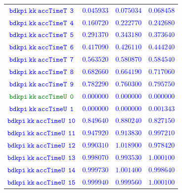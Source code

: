 \documentclass[10pt,a4paper]{article}
\begin{document}
\begin{table}[h!]
{\begin{tabular}{cccc}
\textcolor{blue}{$\mathtt{bdkpi~kk~accTimeT~~3}$} & \textcolor{blue}{$0.045933$}& \textcolor{blue}{$0.075034$}& \textcolor{blue}{$0.068458$}\\
\textcolor{blue}{$\mathtt{bdkpi~kk~accTimeT~~4}$} & \textcolor{blue}{$0.160720$}& \textcolor{blue}{$0.222770$}& \textcolor{blue}{$0.242680$}\\
\textcolor{blue}{$\mathtt{bdkpi~kk~accTimeT~~5}$} & \textcolor{blue}{$0.291370$}& \textcolor{blue}{$0.343180$}& \textcolor{blue}{$0.373640$}\\
\textcolor{blue}{$\mathtt{bdkpi~kk~accTimeT~~6}$} & \textcolor{blue}{$0.417090$}& \textcolor{blue}{$0.426110$}& \textcolor{blue}{$0.444240$}\\
\textcolor{blue}{$\mathtt{bdkpi~kk~accTimeT~~7}$} & \textcolor{blue}{$0.563520$}& \textcolor{blue}{$0.580870$}& \textcolor{blue}{$0.584540$}\\
\textcolor{blue}{$\mathtt{bdkpi~kk~accTimeT~~8}$} & \textcolor{blue}{$0.682660$}& \textcolor{blue}{$0.664190$}& \textcolor{blue}{$0.717060$}\\
\textcolor{blue}{$\mathtt{bdkpi~kk~accTimeT~~9}$} & \textcolor{blue}{$0.782290$}& \textcolor{blue}{$0.760300$}& \textcolor{blue}{$0.795750$}\\
\textcolor{Green}{$\mathtt{bdkpi~kk~accTimeU~~0}$} & \textcolor{blue}{$0.000000$}& \textcolor{blue}{$0.000000$}& \textcolor{blue}{$0.000000$}\\
\textcolor{blue}{$\mathtt{bdkpi~kk~accTimeU~~1}$} & \textcolor{blue}{$0.000000$}& \textcolor{blue}{$0.000000$}& \textcolor{blue}{$0.001343$}\\
\textcolor{blue}{$\mathtt{bdkpi~kk~accTimeU~~10}$} & \textcolor{blue}{$0.849640$}& \textcolor{blue}{$0.880240$}& \textcolor{blue}{$0.827150$}\\
\textcolor{blue}{$\mathtt{bdkpi~kk~accTimeU~~11}$} & \textcolor{blue}{$0.947920$}& \textcolor{blue}{$0.913830$}& \textcolor{blue}{$0.997210$}\\
\textcolor{blue}{$\mathtt{bdkpi~kk~accTimeU~~12}$} & \textcolor{blue}{$0.990310$}& \textcolor{blue}{$1.018900$}& \textcolor{blue}{$0.978420$}\\
\textcolor{blue}{$\mathtt{bdkpi~kk~accTimeU~~13}$} & \textcolor{blue}{$0.998070$}& \textcolor{blue}{$0.993530$}& \textcolor{blue}{$1.000100$}\\
\textcolor{blue}{$\mathtt{bdkpi~kk~accTimeU~~14}$} & \textcolor{blue}{$0.999730$}& \textcolor{blue}{$1.001400$}& \textcolor{blue}{$0.998640$}\\
\textcolor{blue}{$\mathtt{bdkpi~kk~accTimeU~~15}$} & \textcolor{blue}{$0.999940$}& \textcolor{blue}{$0.999560$}& \textcolor{blue}{$1.000100$}\\

\end{tabular}}
\end{table}
\end{document}
